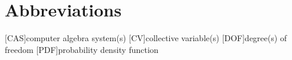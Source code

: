 \section*{Abbreviations}

\def\aclabelfont#1{\textsc{\MakeLowercase{#1}}}

\begin{acronym}[XXXXX~~~]\baselineskip
  [CAS]{computer algebra system(s)}
  [CV]{collective variable(s)}
  [DOF]{degree(s) of freedom}
  [PDF]{probability density function}
\end{acronym}
